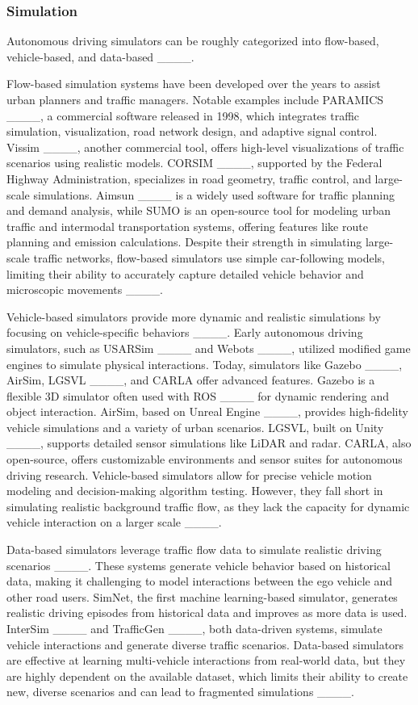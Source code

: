 \subsubsection{Simulation}

Autonomous driving simulators can be roughly categorized into flow-based, vehicle-based, and data-based ____.

Flow-based simulation systems have been developed over the years to assist urban planners and traffic managers. Notable examples include PARAMICS ____, a commercial software released in 1998, which integrates traffic simulation, visualization, road network design, and adaptive signal control. Vissim ____, another commercial tool, offers high-level visualizations of traffic scenarios using realistic models. CORSIM ____, supported by the Federal Highway Administration, specializes in road geometry, traffic control, and large-scale simulations. Aimsun ____ is a widely used software for traffic planning and demand analysis, while SUMO is an open-source tool for modeling urban traffic and intermodal transportation systems, offering features like route planning and emission calculations. Despite their strength in simulating large-scale traffic networks, flow-based simulators use simple car-following models, limiting their ability to accurately capture detailed vehicle behavior and microscopic movements ____.

Vehicle-based simulators provide more dynamic and realistic simulations by focusing on vehicle-specific behaviors ____. Early autonomous driving simulators, such as USARSim ____ and Webots ____, utilized modified game engines to simulate physical interactions. Today, simulators like Gazebo ____, AirSim, LGSVL ____, and CARLA offer advanced features. Gazebo is a flexible 3D simulator often used with ROS ____ for dynamic rendering and object interaction. AirSim, based on Unreal Engine ____, provides high-fidelity vehicle simulations and a variety of urban scenarios. LGSVL, built on Unity ____, supports detailed sensor simulations like LiDAR and radar. CARLA, also open-source, offers customizable environments and sensor suites for autonomous driving research. Vehicle-based simulators allow for precise vehicle motion modeling and decision-making algorithm testing. However, they fall short in simulating realistic background traffic flow, as they lack the capacity for dynamic vehicle interaction on a larger scale ____.

Data-based simulators leverage traffic flow data to simulate realistic driving scenarios ____. These systems generate vehicle behavior based on historical data, making it challenging to model interactions between the ego vehicle and other road users. SimNet, the first machine learning-based simulator, generates realistic driving episodes from historical data and improves as more data is used. InterSim ____ and TrafficGen ____, both data-driven systems, simulate vehicle interactions and generate diverse traffic scenarios. Data-based simulators are effective at learning multi-vehicle interactions from real-world data, but they are highly dependent on the available dataset, which limits their ability to create new, diverse scenarios and can lead to fragmented simulations ____.


